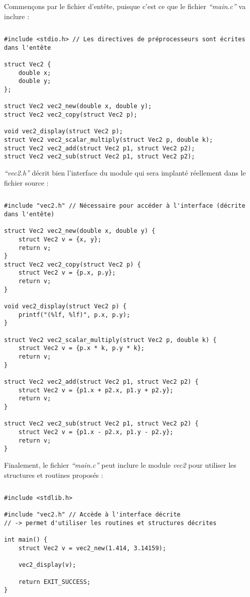\documentclass[../../../main.tex]{subfiles}
\begin{document}
Commençons par le fichier d'entête, puisque c'est ce que le fichier \textit{``main.c''} va inclure :
\begin{lstlisting}[title=vec2.h]
\end{lstlisting}
\begin{verbatim}
#include <stdio.h> // Les directives de préprocesseurs sont écrites dans l'entête

struct Vec2 {
	double x;
	double y;
};

struct Vec2 vec2_new(double x, double y);
struct Vec2 vec2_copy(struct Vec2 p);

void vec2_display(struct Vec2 p);
struct Vec2 vec2_scalar_multiply(struct Vec2 p, double k);
struct Vec2 vec2_add(struct Vec2 p1, struct Vec2 p2);
struct Vec2 vec2_sub(struct Vec2 p1, struct Vec2 p2);
\end{verbatim}
\textit{``vec2.h''} décrit bien l'interface du module qui sera implanté réellement dans le fichier source :
\begin{lstlisting}[title=vec2.c]
\end{lstlisting}
\begin{verbatim}
#include "vec2.h" // Nécessaire pour accéder à l'interface (décrite dans l'entête)

struct Vec2 vec2_new(double x, double y) {
	struct Vec2 v = {x, y};
	return v;
}
struct Vec2 vec2_copy(struct Vec2 p) {
	struct Vec2 v = {p.x, p.y};
	return v;
}

void vec2_display(struct Vec2 p) {
	printf("(%lf, %lf)", p.x, p.y);
}

struct Vec2 vec2_scalar_multiply(struct Vec2 p, double k) {
	struct Vec2 v = {p.x * k, p.y * k};
	return v;
}

struct Vec2 vec2_add(struct Vec2 p1, struct Vec2 p2) {
	struct Vec2 v = {p1.x + p2.x, p1.y + p2.y};
	return v;
}

struct Vec2 vec2_sub(struct Vec2 p1, struct Vec2 p2) {
	struct Vec2 v = {p1.x - p2.x, p1.y - p2.y};
	return v;
}
\end{verbatim}
Finalement, le fichier \textit{``main.c''} peut inclure le module \textit{vec2} pour utiliser les structures et routines proposés :
\begin{lstlisting}[title=main.c]
\end{lstlisting}
\begin{verbatim}
#include <stdlib.h>

#include "vec2.h" // Accède à l'interface décrite
// -> permet d'utiliser les routines et structures décrites

int main() {
	struct Vec2 v = vec2_new(1.414, 3.14159);

	vec2_display(v);

	return EXIT_SUCCESS;
}
\end{verbatim}
\end{document}

